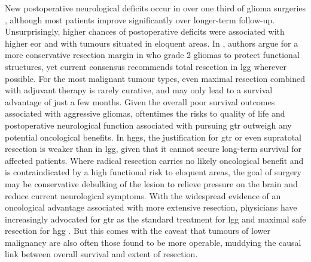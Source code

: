 New postoperative neurological deficits occur in over one third of glioma surgeries \autocite{Zetterling2020a}, although most patients improve significantly over longer-term follow-up.
Unsurprisingly, higher chances of postoperative deficits were associated with higher \gls{eor} and with tumours situated in eloquent areas\autocite{Zetterling2020a}.
In \textcite{Gil-Robles2010}, authors argue for a more conservative resection margin in \gls{who} grade 2 gliomas to protect functional structures, yet current consensus recommends total resection in \gls{lgg} wherever possible\autocite{Rincon-Torroella2019,Albuquerque2021}. %
For the most malignant tumour types, even maximal resection combined with adjuvant therapy is rarely curative, and may only lead to a survival advantage of just a few months\autocite{Rincon-Torroella2019,Karschnia2023}.
Given the overall poor survival outcomes associated with aggressive gliomas, oftentimes the risks to quality of life and postoperative neurological function associated with pursuing \gls{gtr} outweigh any potential oncological benefits\autocite{Rahman2016,Tabor2021}.
In \glspl{hgg}, the justification for \gls{gtr} or even supratotal resection is weaker than in \gls{lgg}, given that it cannot secure long-term survival for affected patients.
Where radical resection carries no likely oncological benefit and is contraindicated by a high functional risk to eloquent areas, the goal of surgery may be conservative debulking of the lesion to relieve pressure on the brain and reduce current neurological symptoms.
With the widespread evidence of an oncological advantage associated with more extensive resection, physicians have increasingly advocated for \gls{gtr} as the standard treatment for \gls{lgg} and maximal safe resection for \gls{hgg} \autocite{Rincon-Torroella2019}.
But this comes with the caveat that tumours of lower malignancy are also often those found to be more operable, muddying the causal link between overall survival and extent of resection\autocite{Weller2021}.

